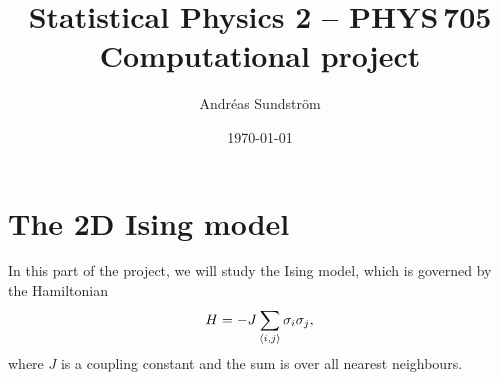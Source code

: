 \documentclass[11pt,letter, swedish, english
]{article}
\begin{document}




\title{Statistical Physics 2 -- PHYS\,705 \\
Computational project}
\author{Andréas Sundström}
\date{\today}

\maketitle


\section{The 2D Ising model}

In this part of the project, we will study the Ising model, which is
governed by the Hamiltonian
\begin{equation}
H=-J\sum_{\ev{i, j}} \sigma_i\sigma_j,
\end{equation}
where $J$ is a coupling constant and the sum is over all nearest
neighbours. 



\end{document}
